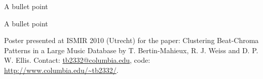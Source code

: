 \documentclass[portrait,a0b,final]{a0poster}
\newenvironment{poster}{
  \begin{center}
  \begin{minipage}[c]{0.98\textwidth}
}{
  \end{minipage} 
  \end{center}
}
\begin{document}
\begin{poster}
\begin{multicols}{3}
\vspace{1.0cm}

\begin{list}{}{\leftmargin=2em =1em}
\item A bullet point
\item A bullet point
\end{list}




\begin{small}


\end{small}

\end{multicols}

\vspace{1cm}
\begin{minipage}{\textwidth}
\begin{small}
\begin{flushright}
Poster presented at ISMIR 2010 (Utrecht) for the paper:
Clustering Beat-Chroma Patterns in a Large Music Database by
T. Bertin-Mahieux, R. J. Weiss and D. P. W. Ellis. Contact:
\url{tb2332@columbia.edu}, code: \url{http://www.columbia.edu/~tb2332/}.
\end{flushright}
\end{small}
\end{minipage}

\end{poster}
\end{document}
